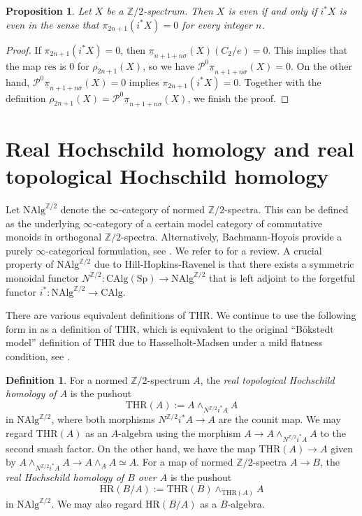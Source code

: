 \documentclass[10pt]{amsart}
\newtheorem{prop}[thm]{Proposition}
\theoremstyle{definition}
\newtheorem{df}[thm]{Definition}
\numberwithin{equation}{section}
\newcommand{\Z}{\mathbb{Z}}
\newcommand{\cP}{\mathcal{P}}
\newcommand{\ul}{\underline}
\newcommand{\CAlg}{\mathrm{CAlg}}
\newcommand{\NAlg}{\mathrm{NAlg}}
\newcommand{\Sp}{\mathrm{Sp}}
\newcommand{\HR}{\mathrm{HR}}
\newcommand{\THR}{\mathrm{THR}}
\newcommand{\res}{\mathrm{res}}
\begin{document}
\begin{prop}\label{prop:even}
Let $X$ be a $\Z/2$-spectrum.
Then $X$ is even if and only if $i^*X$ is even in the sense that $\pi_{2n+1}(i^*X)=0$ for every integer $n$.
\end{prop}
\begin{proof}
If $\pi_{2n+1}(i^*X)=0$,
then $\ul{\pi}_{n+1+n\sigma}(X)(C_2/e)=0$.
This implies that the map $\res$ is $0$ for $\rho_{2n+1}(X)$,
so we have
$\cP^0\ul{\pi}_{n+1+n\sigma}(X)=0$.
On the other hand,
$\cP^0\ul{\pi}_{n+1+n\sigma}(X)=0$ implies $\pi_{2n+1}(i^*X)=0$.
Together with the definition $\rho_{2n+1}(X)=\cP^0\ul{\pi}_{n+1+n\sigma}(X)$,
we finish the proof.
\end{proof}

\section{Real Hochschild homology and real topological Hochschild homology}
\label{sec4}




Let $\NAlg^{\Z/2}$ denote the $\infty$-category of normed $\Z/2$-spectra.
This can be defined as the underlying $\infty$-category of a certain model category \cite[Proposition B.129]{HHR} of commutative monoids in orthogonal $\Z/2$-spectra.
Alternatively,
Bachmann-Hoyois provide a purely $\infty$-categorical formulation,
see \cite[Definition 9.14]{BH21}.
We refer to \cite[Remark A.2.3]{HP23} for a review.
A crucial property of $\NAlg^{\Z/2}$ due to Hill-Hopkins-Ravenel \cite[Proposition 2.27]{HHR} is that there exists a symmetric monoidal functor $N^{\Z/2}\colon \CAlg(\Sp) \to \NAlg^{\Z/2}$ that is left adjoint to the forgetful functor $i^*\colon \NAlg^{\Z/2}\to \CAlg$.

There are various equivalent definitions of $\THR$.
We continue to use the following form in \cite[Definition 2.1.1]{HP23} as a definition of $\THR$, which is equivalent to the original ``B\"okstedt model'' definition of $\THR$ due to Hasselholt-Madsen \cite{HM} under a mild flatness condition, see \cite[Theorem, p.\ 65]{DMPR21}.

\begin{df}\label{def:thrandhr}
For a normed $\Z/2$-spectrum $A$,
the \emph{real topological Hochschild homology of $A$} is the pushout
\[
\THR(A)
:=
A\wedge_{N^{\Z/2} i^* A} A
\]
in $\NAlg^{\Z/2}$,
where both morphisms $N^{\Z/2}i^*A\to A$ are the counit map.
We may regard $\THR(A)$ as an $A$-algebra using the morphism $A\to A\wedge_{N^{\Z/2}i^*A}A$ to the second smash factor.
On the other hand,
we have the map $\THR(A)\to A$ given by $A\wedge_{N^{\Z/2}i^*A }A\to A\wedge_A A\simeq A$.
For a map of normed $\Z/2$-spectra $A\to B$,
the \emph{real Hochschild homology of $B$ over $A$} is the pushout
\[
\HR(B/A)
:=
\THR(B)\wedge_{\THR(A)}A
\]
in $\NAlg^{\Z/2}$.
We may also regard $\HR(B/A)$ as a $B$-algebra.
\end{df}
\end{document}
